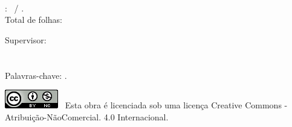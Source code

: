 \addtolength{\topmargin}{5cm}
\thispagestyle{empty}

\begin{framed}

{\raggedright \MySurnameForename} \\

\ProductTitle: \ProductSubtitle\ / \ContractYear. \\

Total de folhas: \pageref{LastPage} \\

\vspace{1cm}

Supervisor: \SupervisorName \\

\SiglaSecretaria \\

\NomeSecretaria \\

Palavras-chave: \PalavrasChave. \\

\end{framed}

\vspace{3cm}

{\raggedright \includegraphics{licenca-cc-by-nc.png} \ Esta obra é licenciada sob
uma licença Creative Commons - Atribuição-NãoComercial. 4.0 Internacional.}

\restoregeometry
\newpage
